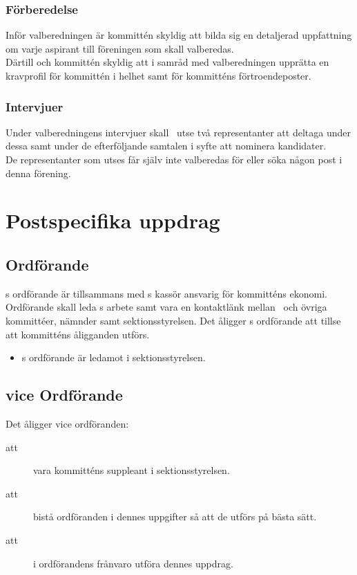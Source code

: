 \subsubsection{Förberedelse}
Inför valberedningen är kommittén skyldig att bilda sig en detaljerad uppfattning om varje aspirant till föreningen som skall valberedas.\\
Därtill och kommittén skyldig att i samråd med valberedningen upprätta en kravprofil för kommittén i helhet samt för kommitténs förtroendeposter.

\subsubsection{Intervjuer}
Under valberedningens intervjuer skall \forening \ utse två representanter att deltaga under dessa samt under de efterföljande samtalen i syfte att nominera kandidater.\\
De representanter som utses får själv inte valberedas för eller söka någon post i denna förening.

\section{Postspecifika uppdrag}

\subsection{Ordförande}
\forening s ordförande är tillsammans med \forening s kassör ansvarig för kommitténs ekonomi. Ordförande skall leda \forening s arbete samt vara en kontaktlänk mellan \forening \ och övriga kommittéer, nämnder samt sektionsstyrelsen. Det åligger \forening s ordförande att tillse att kommitténs åligganden utförs.

\begin{itemize}
\item  \forening s ordförande är ledamot i sektionsstyrelsen.
\end{itemize}

\subsection{vice Ordförande}
Det åligger vice ordföranden:
\begin{description}
\item[att] vara kommitténs suppleant i sektionsstyrelsen. 
\item[att] bistå ordföranden i dennes uppgifter så att de utförs på bästa sätt.
\item[att] i ordförandens frånvaro utföra dennes uppdrag.
\end{description} 

